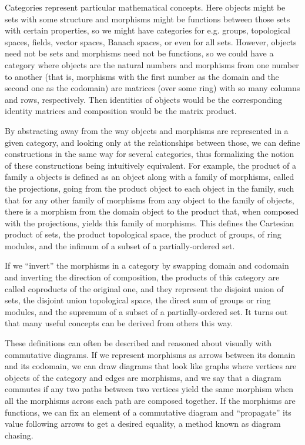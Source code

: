 Categories represent particular mathematical concepts. Here objects might be
sets with some structure and morphisms might be functions between those sets
with certain properties, so we might have categories for e.g. groups,
topological spaces, fields, vector spaces, Banach spaces, or even for all
sets. However, objects need not be sets and morphisms need not be functions, so
we could have a category where objects are the natural numbers and morphisms
from one number to another (that is, morphisms with the first number as the
domain and the second one as the codomain) are matrices (over some ring) with so
many columns and rows, respectively. Then identities of objects would be the
corresponding identity matrices and composition would be the matrix product.

By abstracting away from the way objects and morphisms are represented in a
given category, and looking only at the relationships between those, we can
define constructions in the same way for several categories, thus formalizing
the notion of these constructions being intuitively equivalent. For example, the
product of a family a objects is defined as an object along with a family of
morphisms, called the projections, going from the product object to each object
in the family, such that for any other family of morphisms from any object to
the family of objects, there is a morphism from the domain object to the product
that, when composed with the projections, yields this family of morphisms. This
defines the Cartesian product of sets, the product topological space, the
product of groups, of ring modules, and the infimum of a subset of a
partially-ordered set.

If we ``invert'' the morphisms in a category by swapping domain and codomain and
inverting the direction of composition, the products of this category are called
coproducts of the original one, and they represent the disjoint union of sets,
the disjoint union topological space, the direct sum of groups or ring modules,
and the supremum of a subset of a partially-ordered set. It turns out that many
useful concepts can be derived from others this way.

These definitions can often be described and reasoned about visually with
commutative diagrams. If we represent morphisms as arrows between its domain and
its codomain, we can draw diagrams that look like graphs where vertices are
objects of the category and edges are morphisms, and we say that a diagram
commutes if any two paths between two vertices yield the same morphism when all
the morphisms across each path are composed together. If the morphisms are
functions, we can fix an element of a commutative diagram and ``propagate'' its
value following arrows to get a desired equality, a method known as diagram
chasing.

